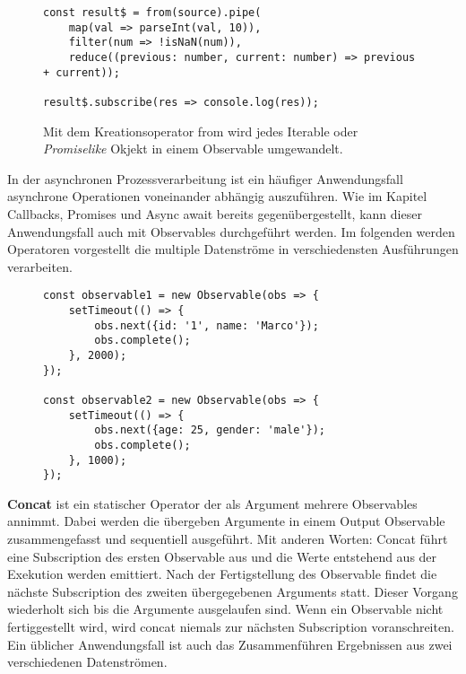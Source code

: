 \begin{figure}[H]
\begin{lstlisting}[basicstyle=\small]
const result$ = from(source).pipe(
    map(val => parseInt(val, 10)),
    filter(num => !isNaN(num)),
    reduce((previous: number, current: number) => previous + current));

result$.subscribe(res => console.log(res));
\end{lstlisting}
\caption{Mit dem Kreationsoperator from wird jedes Iterable oder \textit{Promiselike} Okjekt in einem Observable umgewandelt.}
\end{figure}

\noindent
In der asynchronen Prozessverarbeitung ist ein häufiger Anwendungsfall asynchrone Operationen voneinander abhängig auszuführen. Wie im Kapitel Callbacks, Promises und Async await bereits gegenübergestellt, kann dieser Anwendungsfall auch mit Observables durchgeführt werden. Im folgenden werden Operatoren vorgestellt die multiple Datenströme in verschiedensten Ausführungen verarbeiten.

\begin{figure}[H]
\begin{lstlisting}[basicstyle=\small]
const observable1 = new Observable(obs => {
    setTimeout(() => {
        obs.next({id: '1', name: 'Marco'});
        obs.complete();
    }, 2000);
});

const observable2 = new Observable(obs => {
    setTimeout(() => {
        obs.next({age: 25, gender: 'male'});
        obs.complete();
    }, 1000);
});
\end{lstlisting}
\end{figure}

\noindent
\textbf{Concat} ist ein statischer Operator der als Argument mehrere Observables annimmt. Dabei werden die übergeben Argumente in einem Output Observable zusammengefasst und sequentiell ausgeführt. Mit anderen Worten: Concat führt eine Subscription des ersten Observable aus und die Werte entstehend aus der Exekution werden emittiert. Nach der Fertigstellung des Observable findet die nächste Subscription des zweiten übergegebenen Arguments statt. Dieser Vorgang wiederholt sich bis die Argumente ausgelaufen sind. Wenn ein Observable nicht fertiggestellt wird, wird concat niemals zur nächsten Subscription voranschreiten.\\

\noindent
Ein üblicher Anwendungsfall ist auch das Zusammenführen Ergebnissen aus  zwei verschiedenen Datenströmen.











